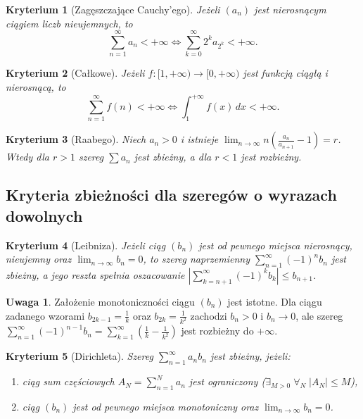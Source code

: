 \documentclass[11pt, a4paper]{article}
\theoremstyle{plain}
\newtheorem*{kryterium}{Kryterium}
\theoremstyle{definition}
\newtheorem*{uwaga}{Uwaga}
\begin{document}
\begin{kryterium}[Zagęszczające Cauchy'ego]
Jeżeli $(a_n)$ jest nierosnącym ciągiem liczb nieujemnych, to
\[
\sum_{n=1}^{\infty} a_n < +\infty \iff \sum_{k=0}^{\infty} 2^k a_{2^k} < +\infty.
\]
\end{kryterium}

\begin{kryterium}[Całkowe]
Jeżeli $f \colon [1, +\infty) \to [0, +\infty)$ jest funkcją ciągłą i nierosnącą, to
\[
\sum_{n=1}^{\infty} f(n) < +\infty \iff \int_{1}^{+\infty} f(x)\,dx < +\infty.
\]
\end{kryterium}

\begin{kryterium}[Raabego]
Niech $a_n > 0$ i istnieje $\lim_{n\to\infty} n\left(\frac{a_n}{a_{n+1}} - 1\right) = r$. Wtedy dla $r > 1$ szereg $\sum a_n$ jest zbieżny, a dla $r < 1$ jest rozbieżny.
\end{kryterium}

\subsection{Kryteria zbieżności dla szeregów o wyrazach dowolnych}

\begin{kryterium}[Leibniza]
Jeżeli ciąg $(b_n)$ jest od pewnego miejsca nierosnący, nieujemny oraz $\lim_{n\to\infty} b_n = 0$, to szereg naprzemienny $\sum_{n=1}^\infty (-1)^n b_n$ jest zbieżny, a jego reszta spełnia oszacowanie $\left\lvert \sum_{k=n+1}^\infty (-1)^k b_k \right\rvert \leqslant b_{n+1}$.
\end{kryterium}

\begin{uwaga}
Założenie monotoniczności ciągu $(b_n)$ jest istotne. Dla ciągu zadanego wzorami $b_{2k-1} = \frac{1}{k}$ oraz $b_{2k} = \frac{1}{k^2}$ zachodzi $b_n > 0$ i $b_n \to 0$, ale szereg $\sum_{n=1}^\infty (-1)^{n-1} b_n = \sum_{k=1}^\infty \left(\frac{1}{k} - \frac{1}{k^2}\right)$ jest rozbieżny do $+\infty$.
\end{uwaga}

\begin{kryterium}[Dirichleta]
Szereg $\sum_{n=1}^\infty a_n b_n$ jest zbieżny, jeżeli:
\begin{enumerate}
    \item ciąg sum częściowych $A_N = \sum_{n=1}^N a_n$ jest ograniczony ($\exists_{M > 0} \; \forall_N \; \lvert A_N \rvert \leqslant M$),
    \item ciąg $(b_n)$ jest od pewnego miejsca monotoniczny oraz $\lim_{n\to\infty} b_n = 0$.
\end{enumerate}
\end{kryterium}
\end{document}
